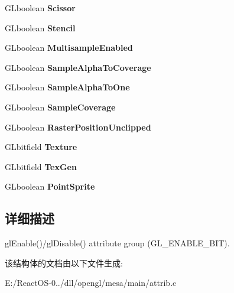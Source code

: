 \begin{DoxyCompactItemize}
G\+Lboolean {\bfseries Scissor}
\item 
\mbox{\label{structgl__enable__attrib_aa3f3f8572e6de3740ada34502a51da0c}} 
G\+Lboolean {\bfseries Stencil}
\item 
\mbox{\label{structgl__enable__attrib_a4b1a05253da8e5e5f65048f48e28f015}} 
G\+Lboolean {\bfseries Multisample\+Enabled}
\item 
\mbox{\label{structgl__enable__attrib_a22aa923ae300976f3b402db89c0fec7d}} 
G\+Lboolean {\bfseries Sample\+Alpha\+To\+Coverage}
\item 
\mbox{\label{structgl__enable__attrib_a5e80004f46933154a5240c3d7ff72992}} 
G\+Lboolean {\bfseries Sample\+Alpha\+To\+One}
\item 
\mbox{\label{structgl__enable__attrib_a10d3d4af5f061d428382b5c1703a397e}} 
G\+Lboolean {\bfseries Sample\+Coverage}
\item 
\mbox{\label{structgl__enable__attrib_af09f0e625ee86daf5c328554641a27d9}} 
G\+Lboolean {\bfseries Raster\+Position\+Unclipped}
\item 
\mbox{\label{structgl__enable__attrib_acdd743fbb23dcb3d76c152ca3e27646d}} 
G\+Lbitfield {\bfseries Texture}
\item 
\mbox{\label{structgl__enable__attrib_a9597f7a1089fd5ed121cd3bd7cb6e8e6}} 
G\+Lbitfield {\bfseries Tex\+Gen}
\item 
\mbox{\label{structgl__enable__attrib_a6cab2e314358a9de9672c67c02a9bfff}} 
G\+Lboolean {\bfseries Point\+Sprite}
\end{DoxyCompactItemize}


\subsection{详细描述}
gl\+Enable()/gl\+Disable() attribute group (G\+L\+\_\+\+E\+N\+A\+B\+L\+E\+\_\+\+B\+IT). 

该结构体的文档由以下文件生成\+:\begin{DoxyCompactItemize}
\item 
E\+:/\+React\+O\+S-\/0../dll/opengl/mesa/main/attrib.\+c\end{DoxyCompactItemize}
